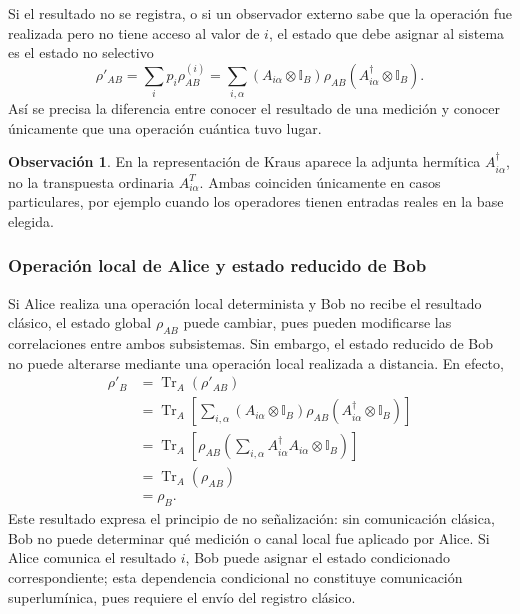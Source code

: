 \documentclass[12pt,a4paper]{article}
\theoremstyle{definition}
\newtheorem{observacion}[definicion]{Observación}
\theoremstyle{plain}
\theoremstyle{remark}
\newcommand{\I}{\mathbb{I}}
\newcommand{\TrA}{\operatorname{Tr}}
\begin{document}
Si el resultado no se registra, o si un observador externo sabe que la operación fue realizada pero no tiene acceso al valor de $i$, el estado que debe asignar al sistema es el estado no selectivo
\begin{equation*}
    \rho'_{AB}
    =\sum_i p_i\rho_{AB}^{(i)}
    =\sum_{i,\alpha}
    \left(A_{i\alpha}\otimes\I_B\right)
    \rho_{AB}
    \left(A_{i\alpha}^{\dagger}\otimes\I_B\right).
\end{equation*}
Así se precisa la diferencia entre conocer el resultado de una medición y conocer únicamente que una operación cuántica tuvo lugar.

\begin{observacion}
En la representación de Kraus aparece la adjunta hermítica $A_{i\alpha}^{\dagger}$, no la transpuesta ordinaria $A_{i\alpha}^{T}$. Ambas coinciden únicamente en casos particulares, por ejemplo cuando los operadores tienen entradas reales en la base elegida.
\end{observacion}

\subsubsection*{Operación local de Alice y estado reducido de Bob}

Si Alice realiza una operación local determinista y Bob no recibe el resultado clásico, el estado global $\rho_{AB}$ puede cambiar, pues pueden modificarse las correlaciones entre ambos subsistemas. Sin embargo, el estado reducido de Bob no puede alterarse mediante una operación local realizada a distancia. En efecto,
\begin{align*}
    \rho'_B
    &=\TrA_A\!\left(\rho'_{AB}\right) \\
    &=\TrA_A\!\left[
        \sum_{i,\alpha}
        \left(A_{i\alpha}\otimes\I_B\right)
        \rho_{AB}
        \left(A_{i\alpha}^{\dagger}\otimes\I_B\right)
      \right] \\
    &=\TrA_A\!\left[
        \rho_{AB}
        \left(
            \sum_{i,\alpha}A_{i\alpha}^{\dagger}A_{i\alpha}
            \otimes\I_B
        \right)
      \right] \\
    &=\TrA_A(\rho_{AB}) \\
    &=\rho_B.
\end{align*}
Este resultado expresa el principio de no señalización: sin comunicación clásica, Bob no puede determinar qué medición o canal local fue aplicado por Alice. Si Alice comunica el resultado $i$, Bob puede asignar el estado condicionado correspondiente; esta dependencia condicional no constituye comunicación superlumínica, pues requiere el envío del registro clásico.
\end{document}
